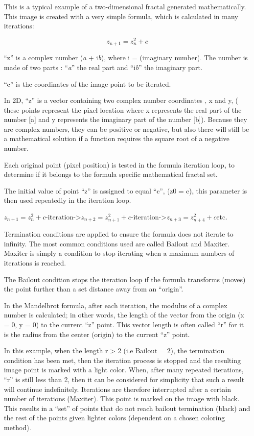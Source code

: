 This is a typical example of a two-dimensional fractal generated
mathematically. This image is created with a very simple formula, which
is calculated in many iterations:

\[z_{n + 1} = z_{n}^{2} + c\]

``z'' is a complex number (\emph{a} + i\emph{b}), where i = (imaginary
number). The number is made of two parts : ``\emph{a}'' the real part
and ``i\emph{b}'' the imaginary part.

``c'' is the coordinates of the image point to be iterated.

In 2D, ``z'' is a vector containing two complex number coordinates , x
and y, ( these points represent the pixel location where x represents
the real part of the number {[}a{]} and y represents the imaginary part
of the number {[}b{]}). Because they are complex numbers, they can be
positive or negative, but also there will still be a mathematical
solution if a function requires the square root of a negative number.

Each original point (pixel position) is tested in the formula iteration
loop, to determine if it belongs to the formula specific mathematical
fractal set.

The initial value of point ``z'' is assigned to equal ``c'', (z0 = c),
this parameter is then used repeatedly in the iteration loop.

\(z_{n + 1} = z_{n}^{2} + c\)-iteration-\textgreater{}\(z_{n + 2} = z_{n + 1}^{2} + c\)-iteration-\textgreater{}\(z_{n + 3} = z_{n + 4}^{2} + c\)etc.

Termination conditions are applied to ensure the formula does not
iterate to infinity. The most common conditions used are called Bailout
and Maxiter. Maxiter is simply a condition to stop iterating when a
maximum numbers of iterations is reached.

The Bailout condition stops the iteration loop if the formula transforms
(moves) the point further than a set distance away from an ``origin''.

In the Mandelbrot formula, after each iteration, the modulus of a
complex number is calculated; in other words, the length of the vector
from the origin (x = 0, y = 0) to the current ``z'' point. This vector
length is often called ``r'' for it is the radius from the center
(origin) to the current ``z'' point.

In this example, when the length r \textgreater{} 2 (i.e Bailout = 2),
the termination condition has been met, then the iteration process is
stopped and the resulting image point is marked with a light color.
When, after many repeated iterations, ``r'' is still less than 2, then
it can be considered for simplicity that such a result will continue
indefinitely. Iterations are therefore interrupted after a certain
number of iterations (Maxiter). This point is marked on the image with
black. This results in a ``set'' of points that do not reach bailout
termination (black) and the rest of the points given lighter colors
(dependent on a chosen coloring method).

